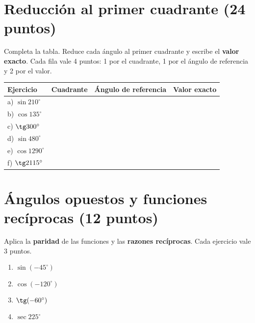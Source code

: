 \documentclass[12pt, letterpaper]{article}
\providecommand{\sen}{\sin}
\begin{document}
\section{Reducción al primer cuadrante (24 puntos)}

\begin{cuadroinfo}
  \small
  Completa la tabla. Reduce cada ángulo al primer cuadrante y escribe el
  \textbf{valor exacto}. Cada fila vale 4 puntos: 1 por el cuadrante,
  1 por el ángulo de referencia y 2 por el valor.
\end{cuadroinfo}

\begin{center}
\renewcommand{\arraystretch}{2.5}
\setlength{\tabcolsep}{9pt}
\begin{tabular}{@{}llll@{}}
  \toprule
  \textbf{Ejercicio} & \textbf{Cuadrante} & \textbf{Ángulo de referencia} & \textbf{Valor exacto} \\
  \midrule
  a) $\sen 210^\circ$  & & & \\
  b) $\cos 135^\circ$  & & & \\
  c) $\tg 300^\circ$   & & & \\
  d) $\sen 480^\circ$  & & & \\
  e) $\cos 1290^\circ$ & & & \\
  f) $\tg 2115^\circ$  & & & \\
  \bottomrule
\end{tabular}
\end{center}

\newpage
\section{Ángulos opuestos y funciones recíprocas (12 puntos)}

\begin{cuadroinfo}
  \small
  Aplica la \textbf{paridad} de las funciones y las \textbf{razones recíprocas}.
  Cada ejercicio vale 3 puntos.
\end{cuadroinfo}

\begin{enumerate}[leftmargin=*, label=\textbf{\alph*)}, itemsep=1.2em]
  \item $\sen(-45^\circ)$
  \item $\cos(-120^\circ)$
  \item $\tg(-60^\circ)$
  \item $\sec 225^\circ$
\end{enumerate}
\end{document}
